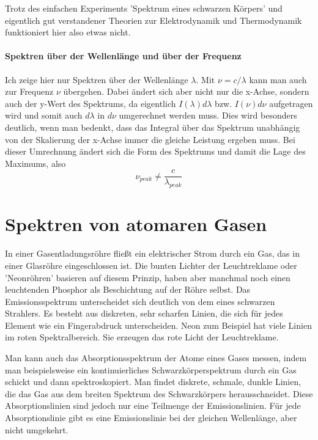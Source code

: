 Trotz des einfachen Experiments 'Spektrum eines schwarzen Körpers' und eigentlich gut verstandener Theorien zur Elektrodynamik und Thermodynamik funktioniert hier also etwas nicht.


\paragraph*{Spektren über der Wellenlänge und über der Frequenz} Ich zeige hier nur Spektren über der Wellenlänge $\lambda$. Mit $\nu = c / \lambda$ kann man auch zur Frequenz $\nu$ übergehen. Dabei ändert sich aber nicht nur die x-Achse, sondern auch der y-Wert des Spektrums, da eigentlich $I(\lambda) d\lambda$ bzw. $I(\nu) d\nu$ aufgetragen wird und somit auch $d\lambda$ in $d\nu$ umgerechnet werden muss. Dies wird besonders deutlich, wenn man bedenkt, dass das Integral über das Spektrum unabhängig von der Skalierung der x-Achse immer die gleiche Leistung ergeben muss. Bei dieser Umrechnung ändert sich die Form des Spektrums und damit die Lage des Maximums, also 
\begin{equation}
    \nu_{peak} \neq \frac{c}{\lambda_{peak}}
\end{equation}

\section{Spektren von atomaren Gasen}

In einer Gasentladungsröhre fließt ein elektrischer Strom durch ein Gas, das in einer Glasröhre eingeschlossen ist. Die bunten Lichter der Leuchtreklame oder 'Neonröhren' basieren auf diesem Prinzip, haben aber manchmal noch einen leuchtenden Phosphor als Beschichtung auf der Röhre selbst. Das Emissionsspektrum unterscheidet sich deutlich von dem eines schwarzen Strahlers. Es besteht aus diskreten, sehr scharfen Linien, die sich für jedes Element wie ein Fingerabdruck unterscheiden. Neon zum Beispiel hat viele Linien im roten Spektralbereich. Sie erzeugen das rote Licht der Leuchtreklame.

Man kann auch das Absorptionsspektrum der Atome eines Gases messen, indem man beispielsweise ein kontinuierliches Schwarzkörperspektrum durch ein Gas schickt und dann spektroskopiert. Man findet diskrete, schmale, dunkle Linien, die das Gas aus dem breiten Spektrum des Schwarzkörpers herausschneidet. Diese Absorptionslinien sind jedoch nur eine Teilmenge der Emissionslinien. Für jede Absorptionslinie gibt es eine Emissionslinie bei der gleichen Wellenlänge, aber nicht umgekehrt.

